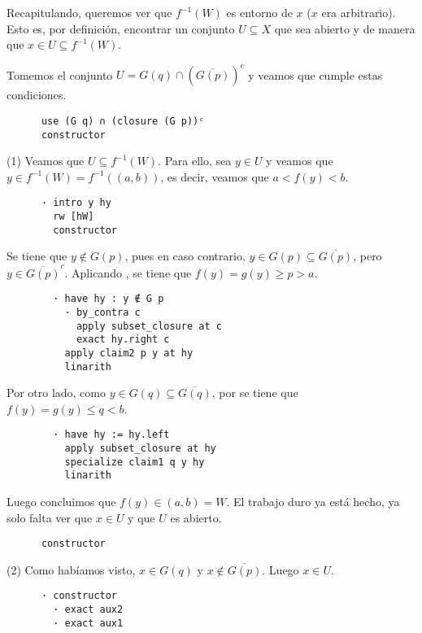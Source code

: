 Recapitulando, queremos ver que $f^{-1}(W)$ es entorno de $x$ ($x$ era arbitrario). Esto es, por definición, encontrar un conjunto $U\subseteq X$ que sea abierto y de manera que $x \in U \subseteq f^{-1}(W)$.

Tomemos el conjunto $U = G(q) \cap (\overline{G(p)})^c$ y veamos que cumple estas condiciones.

\begin{lstlisting}
      use (G q) ∩ (closure (G p))ᶜ
      constructor
\end{lstlisting}

(1) Veamos que $U \subseteq f^{-1}(W)$. Para ello, sea $y \in U$ y veamos que $y \in f^{-1}(W) = f^{-1}((a, b))$, es decir, veamos que $a < f(y) < b$.

\begin{lstlisting}
      · intro y hy
        rw [hW]
        constructor
\end{lstlisting}

Se tiene que $y \notin G(p)$, pues en caso contrario, $y \in G(p) \subseteq \overline{G(p)}$, pero $y \in \overline{G(p)}^c$. Aplicando , se tiene que $f(y) = g(y) \geq p > a$.

\begin{lstlisting}
        · have hy : y ∉ G p
          · by_contra c
            apply subset_closure at c
            exact hy.right c
          apply claim2 p y at hy
          linarith
\end{lstlisting}

Por otro lado, como $y \in G(q) \subseteq \overline{G(q)}$, por  se tiene que $f(y) = g(y) \leq q < b$.

\begin{lstlisting}
        · have hy := hy.left
          apply subset_closure at hy
          specialize claim1 q y hy
          linarith
\end{lstlisting}

Luego concluimos que $f(y) \in (a, b) = W$. El trabajo duro ya está hecho, ya solo falta ver que $x \in U$ y que $U$ es abierto.

\begin{lstlisting}
      constructor
\end{lstlisting}

(2) Como habíamos visto, $x \in G(q)$ y $x \notin \overline{G(p)}$. Luego $x \in U$.

\begin{lstlisting}
      · constructor
        · exact aux2
        · exact aux1
\end{lstlisting}

